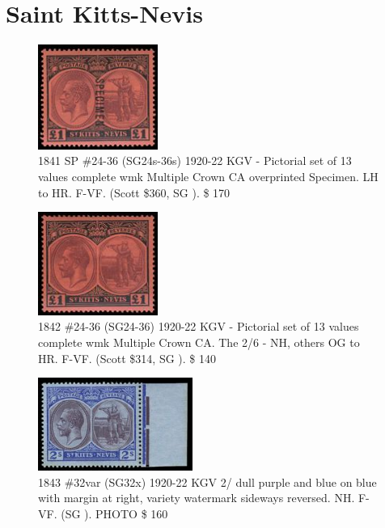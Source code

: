 \chapter{Saint Kitts-Nevis}    


\begin{figure}[htbp]
\centering
\includegraphics[width=0.35\textwidth]{../st-kitts-nevis/1841.jpg}
\caption{
1841
 SP
\#24-36 (SG24s-36s) 1920-22 KGV \halfd -  Pictorial set of 13 values 
complete wmk Multiple Crown CA overprinted Specimen. 
LH to HR. F-VF. (Scott \$360, SG ). 
\$      170
} 
\end{figure}  


\begin{figure}[htbp]
\centering
\includegraphics[width=0.35\textwidth]{../st-kitts-nevis/1842.jpg}
\caption{
1842
\#24-36 (SG24-36) 1920-22 KGV \halfd -  Pictorial set of 13 values 
complete wmk Multiple Crown CA. The 2/6 -  NH, others OG to HR. F-VF. 
(Scott \$314, SG ). 
\$      140
} 
\end{figure}  

\begin{figure}[htbp]
\centering
\includegraphics[width=0.45\textwidth]{../st-kitts-nevis/1843.jpg}
\caption{
1843
\#32var (SG32x) 1920-22 KGV 2/ dull purple and blue on blue 
with margin at right, variety watermark sideways reversed. NH. 
F-VF. (SG ). PHOTO
\$      160
} 
\end{figure}  

